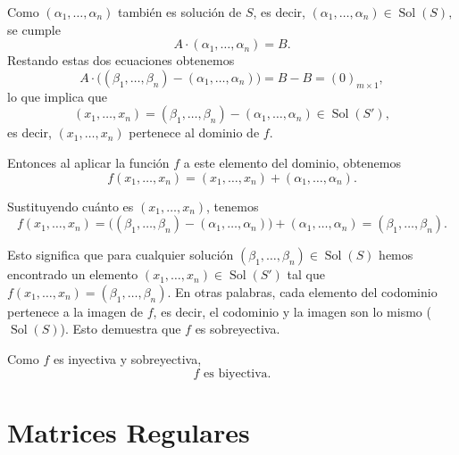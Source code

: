\documentclass[a4paper,12pt]{article}
\begin{document}
\begin{ejercicio}[title=Ejercicio 41]
Como $(\alpha_1,\ldots,\alpha_n)$ también es solución de $S$, es decir, 
\(
(\alpha_1,\ldots,\alpha_n) \in \operatorname{Sol}(S),
\)
se cumple
\[
A \cdot (\alpha_1,\ldots,\alpha_n) = B.
\]
Restando estas dos ecuaciones obtenemos
\[
A \cdot \big((\beta_1,\ldots,\beta_n) - (\alpha_1,\ldots,\alpha_n)\big) = B - B = (0)_{m\times 1},
\]
lo que implica que 
\[
(x_1,\ldots,x_n) = (\beta_1,\ldots,\beta_n) - (\alpha_1,\ldots,\alpha_n) \in \operatorname{Sol}(S'),
\]
es decir, $(x_1,\ldots,x_n)$ pertenece al dominio de $f$.

Entonces al aplicar la función $f$ a este elemento del dominio, obtenemos
\[
f(x_1,\ldots,x_n) = (x_1,\ldots,x_n) + (\alpha_1,\ldots,\alpha_n).
\]

Sustituyendo cuánto es $(x_1,\ldots,x_n)$, tenemos
\[
f(x_1,\ldots,x_n) = \big((\beta_1,\ldots,\beta_n) - (\alpha_1,\ldots,\alpha_n)\big) + (\alpha_1,\ldots,\alpha_n) = (\beta_1,\ldots,\beta_n).
\]

Esto significa que para cualquier solución $(\beta_1,\ldots,\beta_n) \in \operatorname{Sol}(S)$ hemos encontrado un elemento $(x_1,\ldots,x_n) \in \operatorname{Sol}(S')$ tal que $f(x_1,\ldots,x_n) = (\beta_1,\ldots,\beta_n)$.  
En otras palabras, cada elemento del codominio pertenece a la imagen de $f$, es decir, el codominio y la imagen son lo mismo ($\operatorname{Sol}(S)$). Esto demuestra que $f$ es sobreyectiva.

\medskip

Como $f$ es inyectiva y sobreyectiva,
\[
\boxed{\text{$f$ es biyectiva.}}
\]

\end{ejercicio}

\section{Matrices Regulares}
\end{document}
